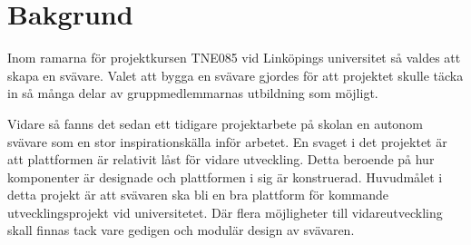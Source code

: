 \section{Bakgrund}
Inom ramarna för projektkursen TNE085 vid Linköpings universitet så
valdes att skapa en svävare. Valet att bygga en svävare gjordes för att
projektet skulle täcka in så många delar av gruppmedlemmarnas utbildning som
möjligt.

Vidare så fanns det sedan ett tidigare projektarbete på skolan en autonom
svävare som en stor inspirationskälla inför arbetet. En svaget i det projektet
är att plattformen är relativit låst för vidare utveckling. Detta beroende på
hur komponenter är designade och plattformen i sig är konstruerad. Huvudmålet
i detta projekt är att svävaren ska bli en bra plattform för kommande
utvecklingsprojekt vid universitetet. Där flera möjligheter till
vidareutveckling skall finnas tack vare gedigen och modulär design av svävaren.
